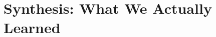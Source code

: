 \documentclass[11pt]{article}
\theoremstyle{remark}
\begin{document}
\part{Synthesis: What We Actually Learned}
\label{part:synthesis}





\printbibliography[title=References]

\appendix




\end{document}
